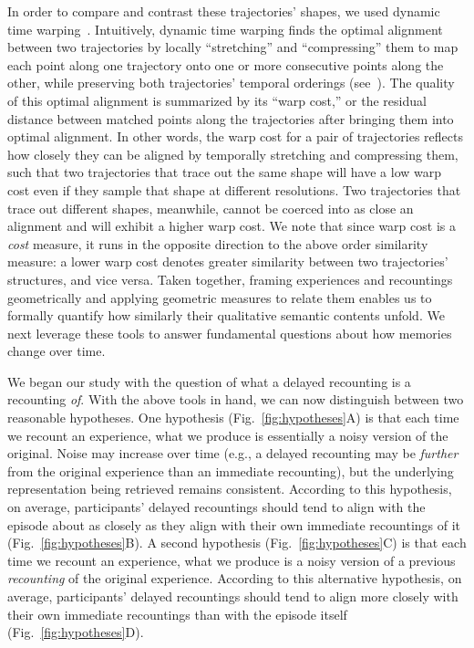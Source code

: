\documentclass[10pt]{article}
\renewcommand{\nameref}[1]{\textit{\oldnameref{#1}}}
\begin{document}
In order to compare and contrast these trajectories' shapes, we used dynamic time warping~\citep{Vint68,SakoChib78}.
Intuitively, dynamic time warping finds the optimal alignment between two trajectories by locally ``stretching'' and ``compressing'' them to map each point along one trajectory onto one or more consecutive points along the other, while preserving both trajectories' temporal orderings (see~\nameref{subsec:dtw}).
The quality of this optimal alignment is summarized by its ``warp cost,'' or the residual distance between matched points along the trajectories after bringing them into optimal alignment.
In other words, the warp cost for a pair of trajectories reflects how closely they can be aligned by temporally stretching and compressing them, such that two trajectories that trace out the same shape will have a low warp cost even if they sample that shape at different resolutions.
Two trajectories that trace out different shapes, meanwhile, cannot be coerced into as close an alignment and will exhibit a higher warp cost.
We note that since warp cost is a \textit{cost} measure, it runs in the opposite direction to the above order similarity measure: a lower warp cost denotes greater similarity between two trajectories' structures, and vice versa.
Taken together, framing experiences and recountings geometrically and applying geometric measures to relate them enables us to formally quantify how similarly their qualitative semantic contents unfold.
We next leverage these tools to answer fundamental questions about how memories change over time.

We began our study with the question of what a delayed recounting is a recounting \textit{of}.
With the above tools in hand, we can now distinguish between two reasonable hypotheses.
One hypothesis (Fig.~\ref{fig:hypotheses}A) is that each time we recount an experience, what we produce is essentially a noisy version of the original.
Noise may increase over time (e.g., a delayed recounting may be \textit{further} from the original experience than an immediate recounting), but the underlying representation being retrieved remains consistent.
According to this hypothesis, on average, participants' delayed recountings should tend to align with the episode about as closely as they align with their own immediate recountings of it (Fig.~\ref{fig:hypotheses}B).
A second hypothesis (Fig.~\ref{fig:hypotheses}C) is that each time we recount an experience, what we produce is a noisy version of a previous \textit{recounting} of the original experience.
According to this alternative hypothesis, on average, participants' delayed recountings should tend to align more closely with their own immediate recountings than with the episode itself (Fig.~\ref{fig:hypotheses}D).
\end{document}
